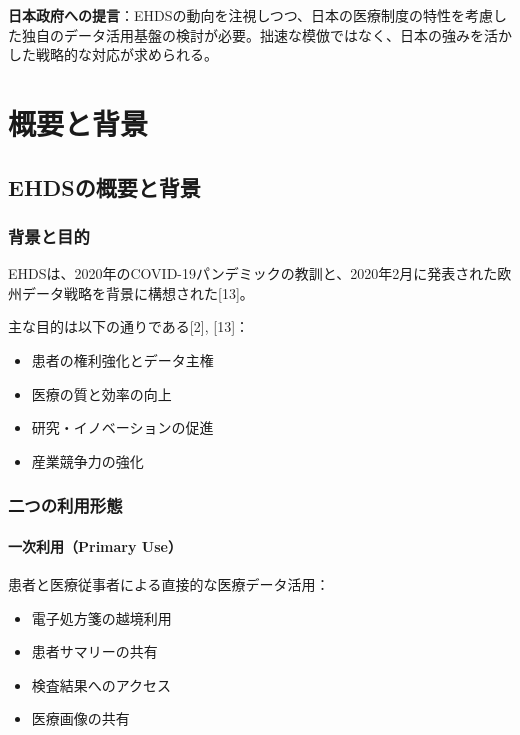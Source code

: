 \documentclass[
  a4paper,
  a4paper,
  11pt]{ltjsbook}
\providecommand{\tightlist}{%
  \setlength{\itemsep}{0pt}\setlength{\parskip}{0pt}}
\begin{document}
\textbf{日本政府への提言}：EHDSの動向を注視しつつ、日本の医療制度の特性を考慮した独自のデータ活用基盤の検討が必要。拙速な模倣ではなく、日本の強みを活かした戦略的な対応が求められる。

\part{概要と背景}

\chapter{EHDSの概要と背景}\label{ehdsux306eux6982ux8981ux3068ux80ccux666f}

\section{背景と目的}\label{ux80ccux666fux3068ux76eeux7684}

EHDSは、2020年のCOVID-19パンデミックの教訓と、2020年2月に発表された欧州データ戦略を背景に構想された{[}13{]}。

主な目的は以下の通りである{[}2{]}, {[}13{]}：

\begin{itemize}
\tightlist
\item
  患者の権利強化とデータ主権
\item
  医療の質と効率の向上
\item
  研究・イノベーションの促進
\item
  産業競争力の強化
\end{itemize}

\section{二つの利用形態}\label{ux4e8cux3064ux306eux5229ux7528ux5f62ux614b}

\subsection{一次利用（Primary
Use）}\label{ux4e00ux6b21ux5229ux7528primary-use}

患者と医療従事者による直接的な医療データ活用：

\begin{itemize}
\tightlist
\item
  電子処方箋の越境利用
\item
  患者サマリーの共有
\item
  検査結果へのアクセス
\item
  医療画像の共有
\end{itemize}
\end{document}
